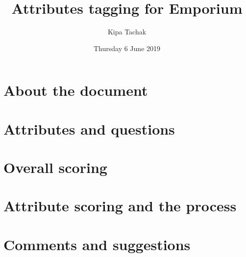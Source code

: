 \documentclass[oneside,twocolumn]{article}
\title{Attributes tagging for Emporium}
\author{Kipa Tachak}
\date{Thursday  6 June 2019}
\begin{document}
\maketitle

\section{About the document}

\section{Attributes and questions}

\section{Overall scoring}

\section{Attribute scoring and the process}

\section{Comments and suggestions}
\end{document}
